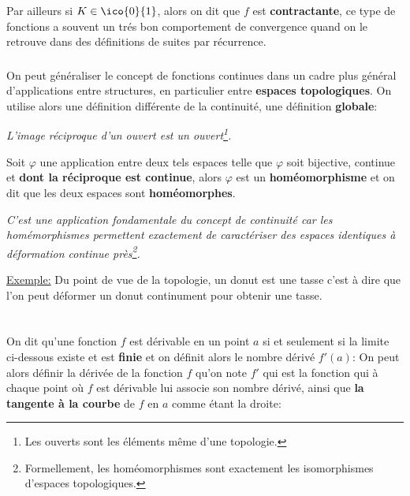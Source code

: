 Par ailleurs si \(K \in \ico{0}{1}\), alors on dit que \(f\) est \textbf{contractante}, ce type de fonctions a souvent un trés bon comportement de convergence quand on le retrouve dans des définitions de suites par récurrence.

\subsection*{}

On peut généraliser le concept de fonctions continues dans un cadre plus général d'applications entre structures, en particulier entre \textbf{espaces topologiques}. On utilise alors une définition différente de la continuité, une définition \textbf{globale}:
\begin{center}
   \textit{L'image réciproque d'un ouvert est un ouvert\footnote[2]{Les ouverts sont les éléments même d'une topologie.}.}
\end{center}

Soit \(\varphi\) une application entre deux tels espaces telle que \(\varphi\) soit bijective, continue et \textbf{dont la réciproque est continue}, alors \(\varphi\) est un \textbf{homéomorphisme} et on dit que les deux espaces sont \textbf{homéomorphes}.
\begin{center}
   \textit{
      C'est une application fondamentale du concept de continuité car les homémorphismes permettent exactement de caractériser des espaces identiques à déformation continue près\footnote[3]{Formellement, les homéomorphismes sont exactement les isomorphismes d'espaces topologiques.}.
   }
\end{center}
\underline{Exemple:} Du point de vue de la topologie, un donut est une tasse c'est à dire que l'on peut déformer un donut continument pour obtenir une tasse.

\chapter*{} %

\subsection*{}

On dit qu'une fonction \(f\) est dérivable en un point \(a\) si et seulement si la limite ci-dessous existe et est \textbf{finie} et on définit alors le nombre dérivé \(f'(a)\):
On peut alors définir la dérivée de la fonction \(f\) qu'on note \(f'\)  qui est la fonction qui à chaque point où \(f\) est dérivable lui associe son nombre dérivé, ainsi que \textbf{la tangente à la courbe} de \(f\) en \(a\) comme étant la droite:

